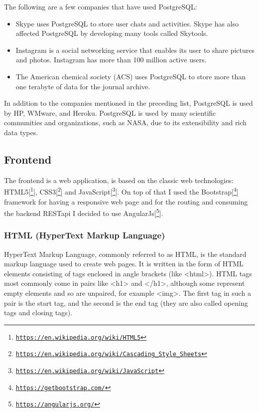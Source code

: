 The following are a few companies that have used PostgreSQL:
\begin{itemize}
	\item Skype uses PostgreSQL to store user chats and activities. Skype has also affected PostgreSQL by developing many tools called Skytools.
	\item Instagram is a social networking service that enables its user to share pictures and photos. Instagram has more than 100 million active users.
	\item The American chemical society (ACS) uses PostgreSQL to store more than one terabyte of data for the journal archive.
\end{itemize}
In addition to the companies mentioned in the preceding list, PostgreSQL is used by HP, WMware, and Heroku. PostgreSQL is used by many scientific communities and organizations, such as NASA, due to its extensibility and rich data types.

\subsection{Frontend}
The frontend is a web application, is based on the classic web technologies: HTML5[\footnote{\href{https://en.wikipedia.org/wiki/HTML5}{\texttt{https://en.wikipedia.org/wiki/HTML5}}}], CSS3[\footnote{\href{https://en.wikipedia.org/wiki/Cascading\_Style\_Sheets}{\texttt{https://en.wikipedia.org/wiki/Cascading\_Style\_Sheets}}}] and JavaScript[\footnote{\href{https://en.wikipedia.org/wiki/JavaScript}{\texttt{https://en.wikipedia.org/wiki/JavaScript}}}]. On top of that I used the Bootstrap[\footnote{\href{https://getbootstrap.com/}{\texttt{https://getbootstrap.com/}}}] framework for having a responsive web page and for the routing and consuming the backend RESTapi I decided to use AngularJs[\footnote{\href{https://angularjs.org/}{\texttt{https://angularjs.org/}}}].


\subsubsection*{HTML (HyperText Markup Language)}
HyperText Markup Language, commonly referred to as HTML, is the standard markup language used to create web pages. It is written in the form of HTML elements consisting of tags enclosed in angle brackets (like <html>). HTML tags most commonly come in pairs like <h1> and </h1>, although some represent empty elements and so are unpaired, for example <img>. The first tag in such a pair is the start tag, and the second is the end tag (they are also called opening tags and closing tags).
\newline

